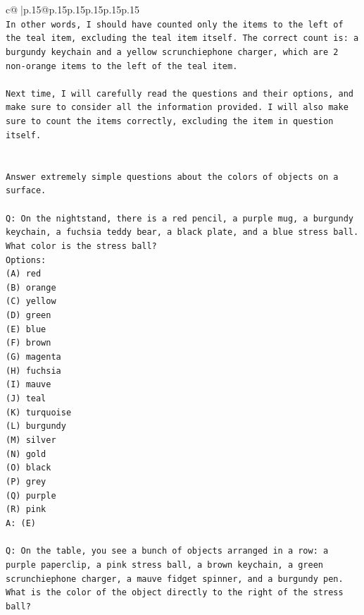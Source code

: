 \documentclass{article}
\begin{document}
{\begin{supertabular}{c@{$\;$}|p{.15\linewidth}@{}p{.15\linewidth}p{.15\linewidth}p{.15\linewidth}p{.15\linewidth}p{.15\linewidth}}
{{{\\ 
\texttt{In other words, I should have counted only the items to the left of the teal item, excluding the teal item itself. The correct count is: a burgundy keychain and a yellow scrunchiephone charger, which are 2 non{-}orange items to the left of the teal item. } \\
\\ 
\texttt{Next time, I will carefully read the questions and their options, and make sure to consider all the information provided. I will also make sure to count the items correctly, excluding the item in question itself.} \\
\\ 
\\ 
\texttt{Answer extremely simple questions about the colors of objects on a surface.} \\
\\ 
\texttt{Q: On the nightstand, there is a red pencil, a purple mug, a burgundy keychain, a fuchsia teddy bear, a black plate, and a blue stress ball. What color is the stress ball?} \\
\texttt{Options:} \\
\texttt{(A) red} \\
\texttt{(B) orange} \\
\texttt{(C) yellow} \\
\texttt{(D) green} \\
\texttt{(E) blue} \\
\texttt{(F) brown} \\
\texttt{(G) magenta} \\
\texttt{(H) fuchsia} \\
\texttt{(I) mauve} \\
\texttt{(J) teal} \\
\texttt{(K) turquoise} \\
\texttt{(L) burgundy} \\
\texttt{(M) silver} \\
\texttt{(N) gold} \\
\texttt{(O) black} \\
\texttt{(P) grey} \\
\texttt{(Q) purple} \\
\texttt{(R) pink} \\
\texttt{A: (E)} \\
\\ 
\texttt{Q: On the table, you see a bunch of objects arranged in a row: a purple paperclip, a pink stress ball, a brown keychain, a green scrunchiephone charger, a mauve fidget spinner, and a burgundy pen. What is the color of the object directly to the right of the stress ball?} \\
}}}
\end{supertabular}}
\end{document}
